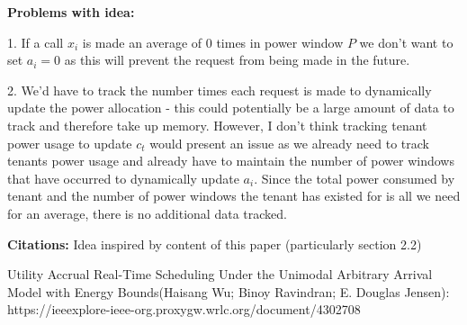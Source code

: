 \documentclass[12pt,english]{amsart}
\begin{document}
 \textbf{Problems with idea:}
 
 1.	If a call $x_i$ is made an average of $0$ times in power window $P$ we don't want to set $a_i=0$ as this will prevent the request from being made in the future.
 
 2.	We'd have to track the number times each request is made to dynamically update the power allocation - this could potentially be a large amount of data to track and therefore take up memory. However, I don't think tracking tenant power usage to update $c_t$ would present an issue as we already need to track tenants power usage and already have to maintain the number of power windows that have occurred to dynamically update $a_i.$ Since the total power consumed by tenant and the number of power windows the tenant has existed for is all we need for an average, there is no additional data tracked.
 
 \bigskip
 
 \textbf{Citations:}
 Idea inspired by content of this paper (particularly section 2.2)
 
 Utility Accrual Real-Time Scheduling Under the Unimodal Arbitrary Arrival Model with Energy Bounds(Haisang Wu; Binoy Ravindran; E. Douglas Jensen):
 https://ieeexplore-ieee-org.proxygw.wrlc.org/document/4302708
\end{document}
